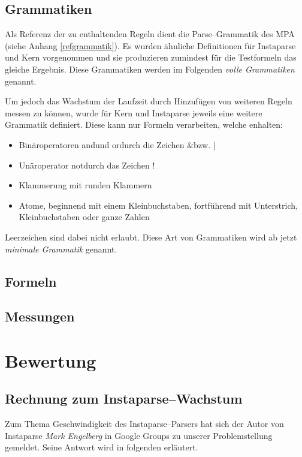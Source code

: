 \documentclass[ngerman,a4paper,abstracton,open=right,twoside=false,toc=listofnumbered,bibtotocnumbered]{scrreprt}
\begin{document}
\section{Grammatiken}

Als Referenz der zu enthaltenden Regeln dient die Parse--Grammatik des MPA (siehe Anhang \ref{refgrammatik}). Es wurden ähnliche Definitionen für Instaparse und Kern vorgenommen und sie produzieren zumindest für die Testformeln das gleiche Ergebnis. Diese Grammatiken werden im Folgenden \emph{volle Grammatiken} genannt.

Um jedoch das Wachstum der Laufzeit durch Hinzufügen von weiteren Regeln messen zu können, wurde für Kern und Instaparse jeweils eine weitere Grammatik definiert. Diese kann nur Formeln verarbeiten, welche enhalten:

\begin{itemize}
	\item Binäroperatoren \glqq and\grqq und \glqq or\grqq durch die Zeichen \glqq \&\grqq bzw. \glqq |\grqq
	\item Unäroperator \glqq not\grqq durch das Zeichen \glqq !\grqq
	\item Klammerung mit runden Klammern
	\item Atome, beginnend mit einem Kleinbuchstaben, fortführend mit Unterstrich, Kleinbuchstaben oder ganze Zahlen
\end{itemize}

Leerzeichen sind dabei nicht erlaubt. Diese Art von Grammatiken wird ab jetzt \emph{minimale Grammatik} genannt.

\section{Formeln}
\section{Messungen}

\chapter{Bewertung}
\section{Rechnung zum Instaparse--Wachstum}

Zum Thema Geschwindigkeit des Instaparse--Parsers hat sich der Autor von Instaparse \emph{Mark Engelberg} in Google Groups zu unserer Problemstellung gemeldet. Seine Antwort wird in folgenden erläutert.
\end{document}
